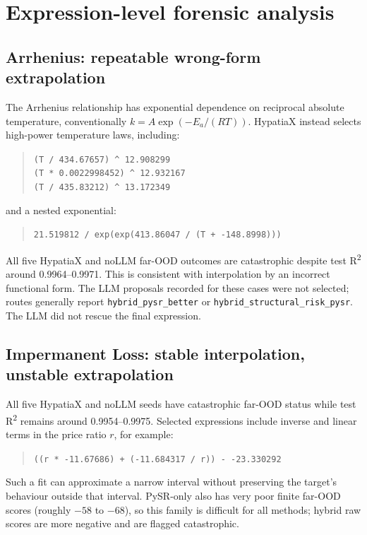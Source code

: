 \documentclass[11pt,a4paper]{article}
\begin{document}
\section{Expression-level forensic analysis}

\subsection{Arrhenius: repeatable wrong-form extrapolation}
The Arrhenius relationship has exponential dependence on reciprocal absolute temperature, conventionally $k=A\exp(-E_a/(RT))$. HypatiaX instead selects high-power temperature laws, including:
\begin{quote}\small
\texttt{(T / 434.67657) \textasciicircum{} 12.908299}\\
\texttt{(T * 0.0022998452) \textasciicircum{} 12.932167}\\
\texttt{(T / 435.83212) \textasciicircum{} 13.172349}
\end{quote}
and a nested exponential:
\begin{quote}\small
\texttt{21.519812 / exp(exp(413.86047 / (T + -148.8998)))}
\end{quote}
All five HypatiaX and noLLM far-OOD outcomes are catastrophic despite test R\textsuperscript{2} around 0.9964--0.9971. This is consistent with interpolation by an incorrect functional form. The LLM proposals recorded for these cases were not selected; routes generally report \texttt{hybrid\_pysr\_better} or \texttt{hybrid\_structural\_risk\_pysr}. The LLM did not rescue the final expression.

\subsection{Impermanent Loss: stable interpolation, unstable extrapolation}
All five HypatiaX and noLLM seeds have catastrophic far-OOD status while test R\textsuperscript{2} remains around 0.9954--0.9975. Selected expressions include inverse and linear terms in the price ratio $r$, for example:
\begin{quote}\small
\texttt{((r * -11.67686) + (-11.684317 / r)) - -23.330292}
\end{quote}
Such a fit can approximate a narrow interval without preserving the target's behaviour outside that interval. PySR-only also has very poor finite far-OOD scores (roughly $-58$ to $-68$), so this family is difficult for all methods; hybrid raw scores are more negative and are flagged catastrophic.
\end{document}
